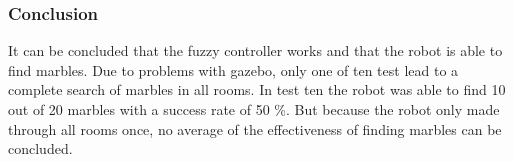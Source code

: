 \documentclass[../Head/Main.tex]{subfiles}
\begin{document}





\subsubsection*{Conclusion}

It can be concluded that the fuzzy controller works and that the robot is able to find marbles. Due to problems with gazebo, only one of ten test lead to a complete search of marbles in all rooms. In test ten the robot was able to find 10 out of 20 marbles with a success rate of 50 \%. But because the robot only made through all rooms once, no average of the effectiveness of finding marbles can be concluded.     
\end{document}
